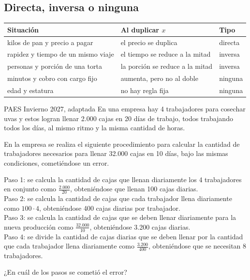 \subsection{Directa, inversa o ninguna}
\begin{center}
\begin{tabular}{@{}lll@{}}
\toprule
Situación & Al duplicar $x$ & Tipo\\ \midrule
kilos de pan y precio a pagar & el precio se duplica & directa\\
rapidez y tiempo de un mismo viaje & el tiempo se reduce a la mitad & inversa\\
personas y porción de una torta & la porción se reduce a la mitad & inversa\\
minutos y cobro con cargo fijo & aumenta, pero no al doble & ninguna\\
edad y estatura & no hay regla fija & ninguna\\ \bottomrule
\end{tabular}
\end{center}

\begin{elejemplo}{PAES Invierno 2027, adaptada}
En una empresa hay 4 trabajadores para cosechar uvas y estos logran llenar 2.000 cajas en 20 días de trabajo, todos trabajando todos los días, al mismo ritmo y la misma cantidad de horas.

En la empresa se realiza el siguiente procedimiento para calcular la cantidad de trabajadores necesarios para llenar 32.000 cajas en 10 días, bajo las mismas condiciones, cometiéndose un error.

Paso 1: se calcula la cantidad de cajas que llenan diariamente los 4 trabajadores en conjunto como $\frac{2.000}{20}$, obteniéndose que llenan 100 cajas diarias.\\
Paso 2: se calcula la cantidad de cajas que cada trabajador llena diariamente como $100\cdot 4$, obteniéndose 400 cajas diarias por trabajador.\\
Paso 3: se calcula la cantidad de cajas que se deben llenar diariamente para la nueva producción como $\frac{32.000}{10}$, obteniéndose 3.200 cajas diarias.\\
Paso 4: se divide la cantidad de cajas diarias que se deben llenar por la cantidad que cada trabajador llena diariamente como $\frac{3.200}{400}$, obteniéndose que se necesitan 8 trabajadores.

¿En cuál de los pasos se cometió el error?
\end{elejemplo}

